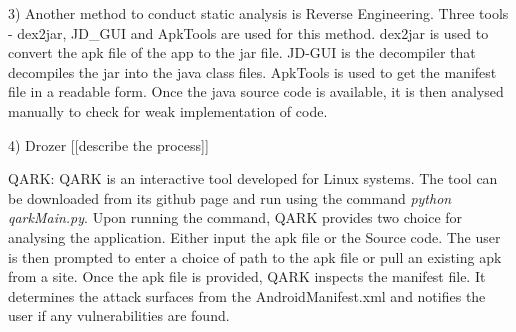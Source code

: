 \documentclass{mproj}
\begin{document}
3) Another method to conduct static analysis is Reverse Engineering. Three tools - dex2jar, JD\_GUI and ApkTools are used for this method. dex2jar is used to convert the apk file of the app to the jar file. JD-GUI is the decompiler that decompiles the jar into the java class files. ApkTools is used to get the manifest file in a readable form. Once the java source code is available, it is then analysed manually to check for weak implementation of code.

4) Drozer [[describe the process]]

QARK:
QARK is an interactive tool developed for Linux systems. The tool can be downloaded from its github page and run using the command \textit{python qarkMain.py}. Upon running the command, QARK provides two choice for analysing the application. Either input the apk file or the Source code. The user is then prompted to enter a choice of path to the apk file or pull an existing apk from a site. Once the apk file is provided, QARK inspects the manifest file. It determines the attack surfaces from the AndroidManifest.xml and notifies the user if any vulnerabilities are found.
\end{document}
